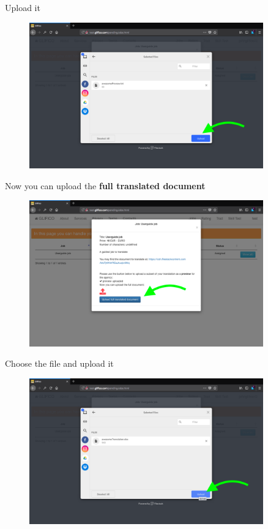 \documentclass[11 pt, a4paper]{article}
\begin{document}
Upload it
\begin{figure}[H]
\centering
\includegraphics[width=0.9\textwidth]{translator_job7.png}
\end{figure}


\clearpage
Now you can upload the \textbf{full translated document}
\begin{figure}[H]
\centering
\includegraphics[width=0.9\textwidth]{translator_job8.png}
\end{figure}

Choose the file and upload it
\begin{figure}[H]
\centering
\includegraphics[width=0.9\textwidth]{translator_job9.png}
\end{figure}
\end{document}
